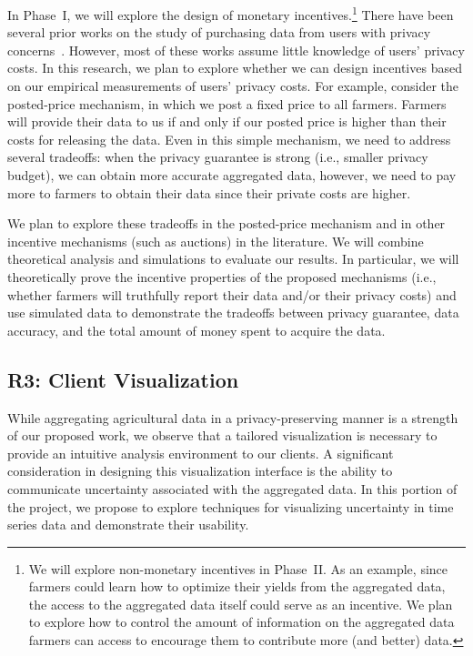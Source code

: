 In Phase~I, we will explore the design of monetary
incentives.\footnote{We  %
will explore non-monetary incentives in Phase~II. 
As an example, since farmers could learn
how to optimize their yields from the aggregated data, the access to the
aggregated data itself could serve as an incentive. 
We plan to explore how to control the amount of information on the aggregated data
farmers can access to encourage them to contribute 
more (and better) data.} %
There have been several prior works on the study of purchasing data from 
users with privacy concerns~\cite{CCK+16,GR11,LL+14,LR12,X13}. 
However, most of these works assume little knowledge of users' privacy costs.
In this research, we plan to explore whether we can design incentives
based on our empirical measurements of users' privacy costs.
For example, consider the posted-price mechanism, 
in which we post a fixed price to all farmers.
Farmers will provide their data to us if and only if our posted price is higher
than their costs for releasing the data.
Even in this simple mechanism, we need to address several tradeoffs:
when the privacy guarantee is strong (i.e., smaller privacy budget), 
we can obtain more accurate aggregated data, however, 
we need to pay more to farmers to obtain their data since their private costs 
are higher. 

We plan to explore these tradeoffs in the posted-price mechanism and in
other incentive mechanisms (such as auctions) in the literature. 
We will combine theoretical analysis and simulations to
evaluate our results. In particular, we will theoretically prove the incentive
properties of the proposed mechanisms (i.e., whether farmers will truthfully 
report their data and/or their privacy costs) and use simulated data to 
demonstrate the tradeoffs between privacy guarantee, data accuracy, and the total
amount of money spent to acquire the data.



\subsection{R3: Client Visualization}
\label{sec:vis}


While aggregating agricultural data in a privacy-preserving manner is a strength of our proposed work, we observe that a tailored visualization is necessary to provide an intuitive analysis environment to our clients. 
A significant consideration in designing this visualization interface is the ability to communicate uncertainty associated with the aggregated data. 
In this portion of the project, we propose to explore techniques for visualizing uncertainty in time series data and demonstrate their usability.

